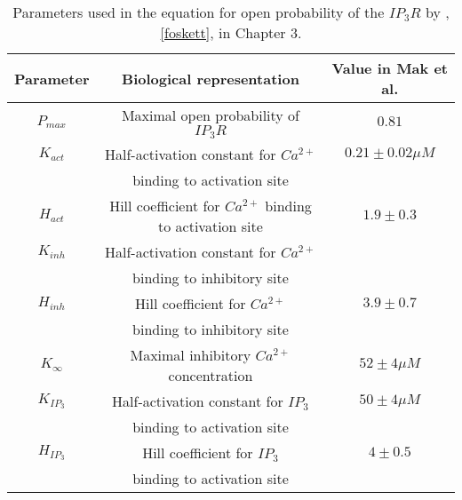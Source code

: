 \begin{table}[h!!!t!!!b!!!p]
\begin{center}
\begin{tabular}{ c c c }
Parameter & Biological representation & Value in Mak et al.\\
\hline
$P_{max}$& Maximal open probability of $IP_3R$ & $0.81$ \\
\hline
$K_{act}$ & Half-activation constant for $Ca^{2+}$ & $0.21 \pm 0.02 \mu M$ \\
& binding to activation site & \\
\hline
$H_{act}$ & Hill coefficient for $Ca^{2+}$ binding to activation site & $1.9 \pm 0.3$ \\
\hline
$K_{inh}$ & Half-activation constant for $Ca^{2+}$ & \\
& binding to inhibitory site & \\
\hline
$H_{inh}$ & Hill coefficient for $Ca^{2+}$ &$3.9 \pm 0.7$ \\
& binding to inhibitory site & \\
\hline
$K_{\infty}$ & Maximal inhibitory $Ca^{2+}$ concentration & $52 \pm 4 \mu M$ \\
\hline
$K_{IP_3}$ & Half-activation constant for $IP_3$ &$50 \pm 4 \mu M$ \\
& binding to activation site & \\
\hline
$H_{IP_3}$ & Hill coefficient for $IP_3$ & $4 \pm 0.5$ \\
& binding to activation site &\\
\end{tabular}
\end{center}
\caption{Parameters used in the equation for open probability of the $IP_3R$ by , \eqref{foskett}, in Chapter 3.}\label{foskettparam}
\end{table}

